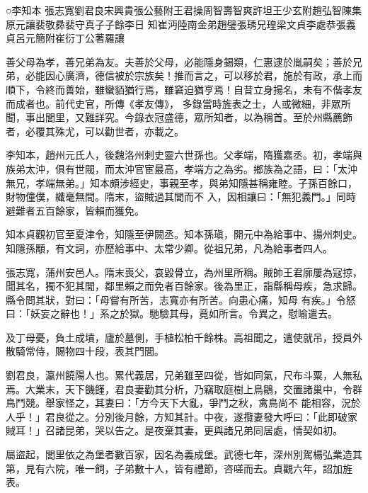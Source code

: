 
\begin{pinyinscope}

 ○李知本
 張志寬劉君良宋興貴張公藝附王君操周智壽智爽許坦王少玄附趙弘智陳集原元讓裴敬彞裴守真子子餘李日
 知崔沔陸南金弟趙璧張琇兄瑝梁文貞李處恭張義貞呂元簡附崔衍丁公著羅讓



 善父母為孝，善兄弟為友。夫善於父母，必能隱身錫類，仁惠逮於胤嗣矣；善於兄弟，必能因心廣濟，德信被於宗族矣！推而言之，可以移於君，施於有政，承上而順下，令終而善始，雖蠻貊猶行焉，雖窘迫猶亨焉！自昔立身揚名，未有不偕孝友而成者也。前代史官，所傳《孝友傳》，
 多錄當時旌表之士，人或微細，非眾所聞，事出閭里，又難詳究。今錄衣冠盛德，眾所知者，以為稱首。至於州縣薦飾者，必覆其殊尤，可以勸世者，亦載之。



 李知本，趙州元氏人，後魏洛州刺史靈六世孫也。父孝端，隋獲嘉丞。初，孝端與族弟太沖，俱有世閥，而太沖官宦最高，孝端方之為劣。鄉族為之語，曰：「太沖無兄，孝端無弟。」知本頗涉經史，事親至孝，與弟知隱甚稱雍睦。子孫百餘口，財物僮僕，纖毫無間。隋末，盜賊過其閭而不
 入，因相讓曰：「無犯義門。」同時避難者五百餘家，皆賴而獲免。



 知本貞觀初官至夏津令，知隱至伊闕丞。知本孫瑱，開元中為給事中、揚州刺史。知隱孫顒，有文詞，亦歷給事中、太常少卿。從祖兄弟，凡為給事者四人。



 張志寬，蒲州安邑人。隋末喪父，哀毀骨立，為州里所稱。賊帥王君廓屢為寇掠，聞其名，獨不犯其閭，鄰里賴之而免者百餘家。後為里正，詣縣稱母疾，急求歸。縣令問其狀，對曰：「母嘗有所苦，志寬亦有所苦。向患心痛，知母
 有疾。」令怒曰：「妖妄之辭也！」系之於獄。馳驗其母，竟如所言。令異之，慰喻遣去。



 及丁母憂，負土成墳，廬於墓側，手植松柏千餘株。高祖聞之，遣使就吊，授員外散騎常侍，賜物四十段，表其門閭。



 劉君良，瀛州饒陽人也。累代義居，兄弟雖至四從，皆如同氣，尺布斗粟，人無私焉。大業末，天下饑饉，君良妻勸其分析，乃竊取庭樹上鳥鶵，交置諸巢中，令群鳥鬥競。舉家怪之，其妻曰：「方今天下大亂，爭鬥之秋，禽鳥尚不
 能相容，況於人乎！」君良從之。分別後月餘，方知其計。中夜，遂攬妻發大呼曰：「此即破家賊耳！」召諸昆弟，哭以告之。是夜棄其妻，更與諸兄弟同居處，情契如初。



 屬盜起，閭里依之為堡者數百家，因名為義成堡。武德七年，深州別駕楊弘業造其第，見有六院，唯一飼，子弟數十人，皆有禮節，咨嗟而去。貞觀六年，詔加旌表。




\end{pinyinscope}
